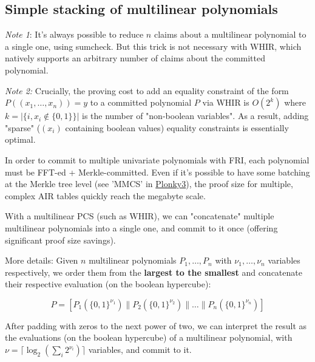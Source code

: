 \documentclass{article}
\theoremstyle{definition}
\begin{document}
\subsection{Simple stacking of multilinear polynomials}

\textit{Note 1}: It's always possible to reduce $n$ claims about a multilinear polynomial to a single one, using sumcheck. But this trick is not necessary with WHIR, which natively supports an arbitrary number of claims about the committed polynomial.
\vspace{3mm}

\textit{Note 2:} Crucially, the proving cost to add an equality constraint of the form $P((x_1, \dots, x_n)) = y$ to a committed polynomial $P$ via WHIR is $O(2^k)$ where $k = {|\{i, x_i \notin \{0, 1\} \}|}$ is the number of "non-boolean variables". As a result, adding "sparse" ($(x_i)$ containing boolean values) equality constraints is essentially optimal.

\vspace{3mm}

In order to commit to multiple univariate polynomials with FRI, each polynomial must be FFT-ed + Merkle-committed.
Even if it's possible to have some batching at the Merkle tree level (see 'MMCS' in \href{https://github.com/Plonky3/Plonky3}{Plonky3}), the proof size for multiple, complex AIR tables quickly reach the megabyte scale.

With a multilinear PCS (such as WHIR), we can "concatenate" multiple multilinear polynomials into a single one, and commit to it once (offering significant proof size savings).

\vspace{5mm}

More details: Given $n$ multilinear polynomials $P_1, \dots, P_n$ with $\nu_1, \dots, \nu_n$ variables respectively, we order them from the \textbf{largest to the smallest} and concatenate their respective evaluation (on the boolean hypercube):

$$P = [P_1(\{0,1\}^{\nu_1}) \| P_2(\{0,1\}^{\nu_2}) \| \dots \| P_n(\{0,1\}^{\nu_n})]$$

After padding with zeros to the next power of two, we can interpret the result as the evaluations (on the boolean hypercube) of a multilinear polynomial, with $\nu = \lceil \log_2(\sum_i 2^{\nu_i}) \rceil$ variables, and commit to it.
\end{document}
